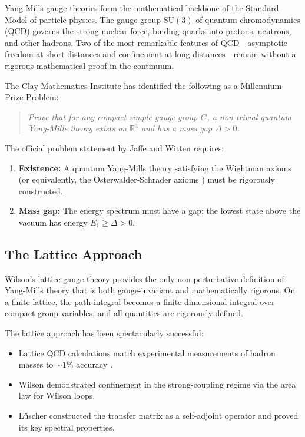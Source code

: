 \documentclass[12pt, a4paper]{article}
\theoremstyle{plain}
\theoremstyle{definition}
\theoremstyle{remark}
\newcommand{\R}{\mathbb{R}}
\newcommand{\SU}{\mathrm{SU}}
\begin{document}
Yang-Mills gauge theories \citep{YangMills1954} form the mathematical backbone
of the Standard Model of particle physics. The gauge group $\SU(3)$ of quantum
chromodynamics (QCD) governs the strong nuclear force, binding quarks into protons,
neutrons, and other hadrons. Two of the most remarkable features of QCD---asymptotic
freedom \citep{GrossWilczek1973, Politzer1973} at short distances and confinement
at long distances---remain without a rigorous mathematical proof in the continuum.

The Clay Mathematics Institute \citep{ClayYM} has identified the following as a
Millennium Prize Problem:

\begin{quote}
  \emph{Prove that for any compact simple gauge group $G$, a non-trivial quantum
  Yang-Mills theory exists on $\R^4$ and has a mass gap $\Delta > 0$.}
\end{quote}

The official problem statement by Jaffe and Witten \citep{JaffeWitten2000}
requires:
\begin{enumerate}[label=(\roman*)]
  \item \textbf{Existence:} A quantum Yang-Mills theory satisfying the
    Wightman axioms \citep{Wightman1964} (or equivalently, the
    Osterwalder-Schrader axioms \citep{OsterwalderSchrader1973,
    OsterwalderSchrader1975}) must be rigorously constructed.
  \item \textbf{Mass gap:} The energy spectrum must have a gap: the
    lowest state above the vacuum has energy $E_1 \geq \Delta > 0$.
\end{enumerate}

\subsection{The Lattice Approach}

Wilson's lattice gauge theory \citep{Wilson1974} provides the only
non-perturbative definition of Yang-Mills theory that is both gauge-invariant
and mathematically rigorous. On a finite lattice, the path integral becomes a
finite-dimensional integral over compact group variables, and all quantities
are rigorously defined.

The lattice approach has been spectacularly successful:
\begin{itemize}
  \item Lattice QCD calculations match experimental measurements of
    hadron masses to $\sim\!1\%$ accuracy \citep{RotheBook}.
  \item Wilson \citep{Wilson1974} demonstrated confinement in the
    strong-coupling regime via the area law for Wilson loops.
  \item L\"uscher \citep{Luscher1977} constructed the transfer matrix
    as a self-adjoint operator and proved its key spectral properties.
\end{itemize}
\end{document}

